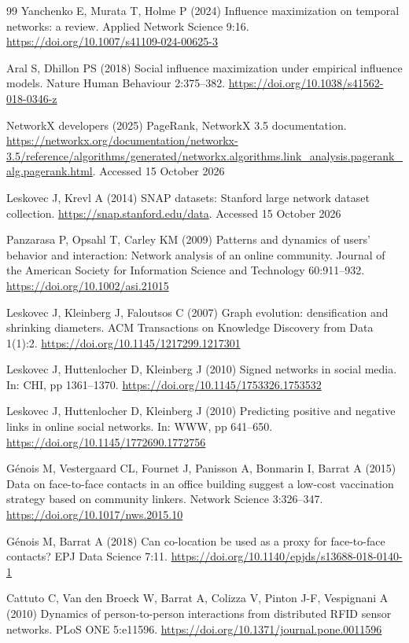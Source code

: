 \documentclass[smallextended]{svjour3}
\begin{document}
\begin{thebibliography}{99}
 Yanchenko E, Murata T, Holme P (2024) Influence maximization on temporal networks: a review. Applied Network Science 9:16. \url{https://doi.org/10.1007/s41109-024-00625-3}

 Aral S, Dhillon PS (2018) Social influence maximization under empirical influence models. Nature Human Behaviour 2:375--382. \url{https://doi.org/10.1038/s41562-018-0346-z}

 NetworkX developers (2025) PageRank, NetworkX 3.5 documentation. \url{https://networkx.org/documentation/networkx-3.5/reference/algorithms/generated/networkx.algorithms.link_analysis.pagerank_alg.pagerank.html}. Accessed 15 October 2026

 Leskovec J, Krevl A (2014) SNAP datasets: Stanford large network dataset collection. \url{https://snap.stanford.edu/data}. Accessed 15 October 2026

 Panzarasa P, Opsahl T, Carley KM (2009) Patterns and dynamics of users' behavior and interaction: Network analysis of an online community. Journal of the American Society for Information Science and Technology 60:911--932. \url{https://doi.org/10.1002/asi.21015}

 Leskovec J, Kleinberg J, Faloutsos C (2007) Graph evolution: densification and shrinking diameters. ACM Transactions on Knowledge Discovery from Data 1(1):2. \url{https://doi.org/10.1145/1217299.1217301}

 Leskovec J, Huttenlocher D, Kleinberg J (2010) Signed networks in social media. In: CHI, pp 1361--1370. \url{https://doi.org/10.1145/1753326.1753532}

 Leskovec J, Huttenlocher D, Kleinberg J (2010) Predicting positive and negative links in online social networks. In: WWW, pp 641--650. \url{https://doi.org/10.1145/1772690.1772756}

 Génois M, Vestergaard CL, Fournet J, Panisson A, Bonmarin I, Barrat A (2015) Data on face-to-face contacts in an office building suggest a low-cost vaccination strategy based on community linkers. Network Science 3:326--347. \url{https://doi.org/10.1017/nws.2015.10}

 Génois M, Barrat A (2018) Can co-location be used as a proxy for face-to-face contacts? EPJ Data Science 7:11. \url{https://doi.org/10.1140/epjds/s13688-018-0140-1}

 Cattuto C, Van den Broeck W, Barrat A, Colizza V, Pinton J-F, Vespignani A (2010) Dynamics of person-to-person interactions from distributed RFID sensor networks. PLoS ONE 5:e11596. \url{https://doi.org/10.1371/journal.pone.0011596}


\end{thebibliography}
\end{document}
